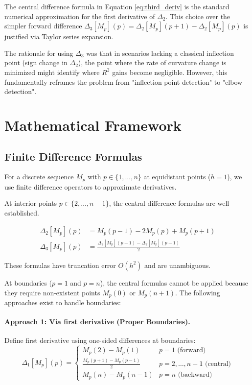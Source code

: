 \documentclass[11pt,a4paper]{article}
\begin{document}
The central difference formula in Equation \ref{eq:third_deriv} is the standard numerical approximation for the first derivative of $\Delta_2$. This choice over the simpler forward difference $\Delta_3[M_p](p) = \Delta_2[M_p](p+1) - \Delta_2[M_p](p)$ is justified via Taylor series expansion.

The rationale for using $\Delta_3$ was that in scenarios lacking a classical inflection point (sign change in $\Delta_2$), the point where the rate of curvature change is minimized might identify where $R^2$ gains become negligible. However, this fundamentally reframes the problem from "inflection point detection" to "elbow detection".

\section{Mathematical Framework}


\subsection{Finite Difference Formulas}

For a discrete sequence $M_p$ with $p \in \{1,\ldots,n\}$ at equidistant points ($h = 1$), we use finite difference operators to approximate derivatives.

At interior points $p \in \{2,\ldots,n-1\}$, the central difference formulas are well-established.

\begin{align}
\Delta_2[M_p](p) &= M_p(p-1) - 2M_p(p) + M_p(p+1) \label{eq:delta2_interior} \\
\Delta_3[M_p](p) &= \frac{\Delta_2[M_p](p+1) - \Delta_2[M_p](p-1)}{2} \label{eq:delta3_interior}
\end{align}

These formulas have truncation error $O(h^2)$ and are unambiguous.

At boundaries ($p=1$ and $p=n$), the central formulas cannot be applied because they require non-existent points $M_p(0)$ or $M_p(n+1)$. The following approaches exist to handle boundaries:

\paragraph{Approach 1: Via first derivative (Proper Boundaries).}
Define first derivative using one-sided differences at boundaries:
\begin{equation}
\Delta_1[M_p](p) = \begin{cases}
M_p(2) - M_p(1) & p = 1 \text{ (forward)} \\
\frac{M_p(p+1) - M_p(p-1)}{2} & p = 2,\ldots,n-1 \text{ (central)} \\
M_p(n) - M_p(n-1) & p = n \text{ (backward)}
\end{cases}
\label{eq:delta1}
\end{equation}
\end{document}
